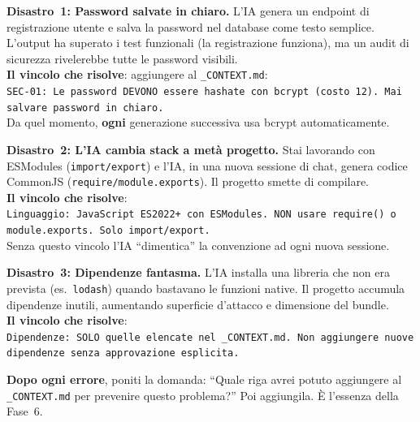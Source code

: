 \begin{dangerbox}
\textbf{Disastro~1: Password salvate in chiaro.} L'IA genera un endpoint di registrazione utente e salva la password nel database come testo semplice. L'output ha superato i test funzionali (la registrazione funziona), ma un audit di sicurezza rivelerebbe tutte le password visibili.\\[4pt]
\textbf{Il vincolo che risolve}: aggiungere al \texttt{\_CONTEXT.md}:\\
\texttt{SEC-01: Le password DEVONO essere hashate con bcrypt (costo~12). Mai salvare password in chiaro.}\\[4pt]
Da quel momento, \textbf{ogni} generazione successiva usa bcrypt automaticamente.
\end{dangerbox}

\begin{dangerbox}
\textbf{Disastro~2: L'IA cambia stack a metà progetto.} Stai lavorando con ESModules (\texttt{import/export}) e l'IA, in una nuova sessione di chat, genera codice CommonJS (\texttt{require/module.exports}). Il progetto smette di compilare.\\[4pt]
\textbf{Il vincolo che risolve}:\\
\texttt{Linguaggio: JavaScript ES2022+ con ESModules. NON usare require() o module.exports. Solo import/export.}\\[4pt]
Senza questo vincolo l'IA ``dimentica'' la convenzione ad ogni nuova sessione.
\end{dangerbox}

\begin{dangerbox}
\textbf{Disastro~3: Dipendenze fantasma.} L'IA installa una libreria che non era prevista (es.\ \texttt{lodash}) quando bastavano le funzioni native. Il progetto accumula dipendenze inutili, aumentando superficie d'attacco e dimensione del bundle.\\[4pt]
\textbf{Il vincolo che risolve}:\\
\texttt{Dipendenze: SOLO quelle elencate nel \_CONTEXT.md. Non aggiungere nuove dipendenze senza approvazione esplicita.}
\end{dangerbox}

\begin{tipbox}
\textbf{Dopo ogni errore}, poniti la domanda: ``Quale riga avrei potuto aggiungere al \texttt{\_CONTEXT.md} per prevenire questo problema?'' Poi aggiungila. È l'essenza della Fase~6.
\end{tipbox}

